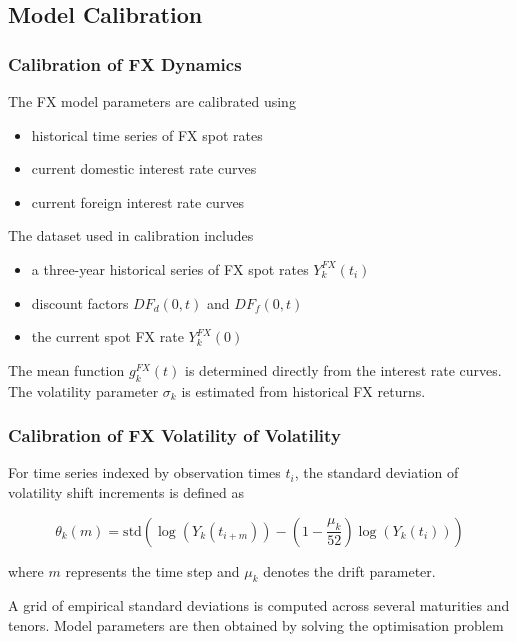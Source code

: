 \subsection{Model Calibration}

\subsubsection{Calibration of FX Dynamics}

The FX model parameters are calibrated using

\begin{itemize}
	\item historical time series of FX spot rates
	\item current domestic interest rate curves
	\item current foreign interest rate curves
\end{itemize}

The dataset used in calibration includes

\begin{itemize}
	\item a three-year historical series of FX spot rates $Y_k^{FX}(t_i)$
	\item discount factors $DF_d(0,t)$ and $DF_f(0,t)$
	\item the current spot FX rate $Y_k^{FX}(0)$
\end{itemize}

The mean function $g_k^{FX}(t)$ is determined directly from the interest rate curves. The volatility parameter $\sigma_k$ is estimated from historical FX returns.

\subsubsection{Calibration of FX Volatility of Volatility}

For time series indexed by observation times $t_i$, the standard deviation of volatility shift increments is defined as

\begin{equation}
	\theta_k(m) =
	\text{std}\left(
	\log(Y_k(t_{i+m})) -
	\left(1-\frac{\mu_k}{52}\right)\log(Y_k(t_i))
	\right)
\end{equation}

where $m$ represents the time step and $\mu_k$ denotes the drift parameter.

A grid of empirical standard deviations is computed across several maturities and tenors. Model parameters are then obtained by solving the optimisation problem

